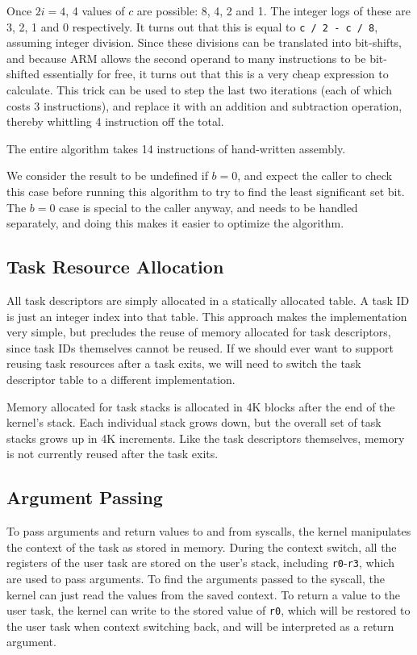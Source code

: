 \documentclass{article}
\begin{document}
Once $2i=4$, 4 values of $c$ are possible: 8, 4, 2 and 1.
The integer logs of these are 3, 2, 1 and 0 respectively.
It turns out that this is equal to \texttt{c / 2 - c / 8},
assuming integer division.
Since these divisions can be translated into bit-shifts, and because
ARM allows the second operand to many instructions to be bit-shifted essentially
for free, it turns out that this is a very cheap expression to calculate.
This trick can be used to step the last two iterations (each of which costs 3
instructions), and replace it with an addition and subtraction operation,
thereby whittling 4 instruction off the total.

The entire algorithm takes 14 instructions of hand-written assembly.

We consider the result to be undefined if $b=0$, and expect the caller to check
this case before running this algorithm to try to find the least significant set bit.
The $b=0$ case is special to the caller anyway, and needs to be handled separately,
and doing this makes it easier to optimize the algorithm.

\subsection{Task Resource Allocation}
All task descriptors are simply allocated in a statically allocated table.
A task ID is just an integer index into that table.
This approach makes the implementation very simple, but precludes the reuse
of memory allocated for task descriptors, since task IDs themselves cannot
be reused.
If we should ever want to support reusing task resources after a task exits,
we will need to switch the task descriptor table to a different implementation.

Memory allocated for task stacks is allocated in 4K blocks after the end of
the kernel's stack.
Each individual stack grows down, but the overall set of task stacks grows up in
4K increments.
Like the task descriptors themselves, memory is not currently reused after the
task exits.

\subsection{Argument Passing}
To pass arguments and return values to and from syscalls, the kernel manipulates
the context of the task as stored in memory.
During the context switch, all the registers of the user task are stored on the
user's stack, including \texttt{r0}-\texttt{r3}, which are used to pass arguments.
To find the arguments passed to the syscall, the kernel can just read the values
from the saved context.
To return a value to the user task, the kernel can write to the stored value of
\texttt{r0}, which will be restored to the user task when context switching back,
and will be interpreted as a return argument.
\end{document}

